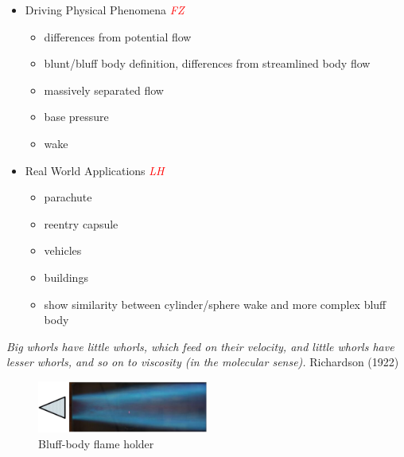 \documentclass[journal]{new-aiaa}
\begin{document}
\begin{itemize}
    \item Driving Physical Phenomena \textcolor{red}{\emph{FZ}}

    \begin{itemize}
        \item differences from potential flow
        \item blunt/bluff body definition, differences from streamlined body flow
        \item massively separated flow
        \item base pressure
        \item wake
    \end{itemize}
    \item Real World Applications \textcolor{red}{\emph{LH}}
    \begin{itemize}
        \item parachute
        \item reentry capsule
        \item vehicles
        \item buildings
        \item show similarity between cylinder/sphere wake and more complex bluff body
    \end{itemize}
\end{itemize}






\emph{Big whorls have little whorls, which feed on their velocity, and little whorls have lesser whorls, and so on to viscosity (in the molecular sense).}
Richardson (1922) \cite{richardson1922weather}





\begin{figure}[H]
\begin{center}
\includegraphics[width=0.5\textwidth]{Images/logan/tanaka2013bluff_FlameHolder.pdf}
\caption{ Bluff-body flame holder \cite{tanaka2013bluff} }
\label{fig:flameholder}
\end{center}
\end{figure}
\end{document}
